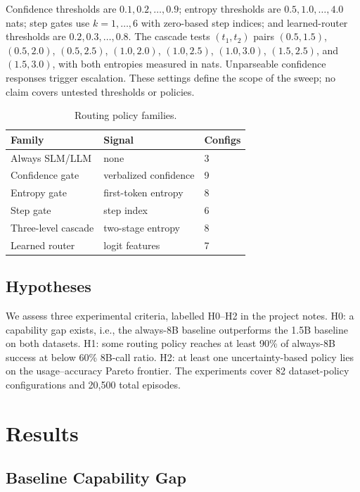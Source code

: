 \documentclass[sigplan,screen,review,anonymous,nonacm]{acmart}
\begin{document}
Confidence thresholds are $0.1,0.2,\ldots,0.9$; entropy thresholds are
$0.5,1.0,\ldots,4.0$ nats; step gates use $k=1,\ldots,6$ with zero-based
step indices; and learned-router thresholds are $0.2,0.3,\ldots,0.8$.
The cascade tests $(t_1,t_2)$ pairs $(0.5,1.5)$, $(0.5,2.0)$,
$(0.5,2.5)$, $(1.0,2.0)$, $(1.0,2.5)$, $(1.0,3.0)$,
$(1.5,2.5)$, and $(1.5,3.0)$, with both entropies measured in nats.
Unparseable confidence responses trigger escalation. These settings define
the scope of the sweep; no claim covers untested thresholds or policies.

\begin{table}[t]
\caption{Routing policy families.}
\label{tab:policies}
\centering
\begin{tabular}{lll}
\toprule
Family & Signal & Configs \\
\midrule
Always SLM/LLM & none & 3 \\
Confidence gate & verbalized confidence & 9 \\
Entropy gate & first-token entropy & 8 \\
Step gate & step index & 6 \\
Three-level cascade & two-stage entropy & 8 \\
Learned router & logit features & 7 \\
\bottomrule
\end{tabular}
\end{table}

\subsection{Hypotheses}

We assess three experimental criteria, labelled H0--H2 in the project notes. H0: a capability gap exists, i.e.,
the always-8B baseline outperforms the 1.5B baseline on both datasets. H1: some routing
policy reaches at least 90\% of always-8B success at below 60\% 8B-call ratio.
H2: at least one uncertainty-based policy lies on the usage--accuracy Pareto frontier. The
experiments cover 82 dataset-policy configurations and 20,500 total episodes.

\section{Results}
\label{sec:results}

\subsection{Baseline Capability Gap}
\end{document}
